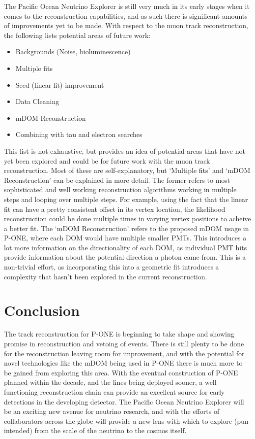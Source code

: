 The Pacific Ocean Neutrino Explorer is still very much in its early stages when it comes to the reconstruction capabilities, and as such there is significant amounts of improvements yet to be made. With respect to the muon track reconstruction, the following lists potential areas of future work:
\begin{multicols}{2}
  \begin{itemize}
  \item Backgrounds (Noise, bioluminescence)
  \item Multiple fits
  \item Seed (linear fit) improvement
  \item Data Cleaning
  \item mDOM Reconstruction
  \item Combining with tau and electron searches
  \end{itemize}
\end{multicols}
This list is not exhaustive, but provides an idea of potential areas that have not yet been explored and could be for future work with the muon track reconstruction. Most of these are self-explanatory, but `Multiple fits' and `mDOM Reconstruction' can be explained in more detail. The former refers to most sophisticated and well working reconstruction algorithms working in multiple steps and looping over multiple steps. For example, using the fact that the linear fit can have a pretty consistent offset in its vertex location, the likelihood reconstruction could be done multiple times in varying vertex positions to acheive a better fit. The `mDOM Reconstruction' refers to the proposed mDOM usage in P-ONE, where each DOM would have multiple smaller PMTs. This introduces a lot more information on the directionality of each DOM, as individual PMT hits provide information about the potential direction a photon came from. This is a non-trivial effort, as incorporating this into a geometric fit introduces a complexity that hasn't been explored in the current reconstruction.

\section{Conclusion}

The track reconstruction for P-ONE is beginning to take shape and showing promise in reconstruction and vetoing of events. There is still plenty to be done for the reconstruction leaving room for improvement, and with the potential for novel technologies like the mDOM being used in P-ONE there is much more to be gained from exploring this area. With the eventual construction of P-ONE planned within the decade, and the lines being deployed sooner, a well functioning reconstruction chain can provide an excellent source for early detections in the developing detector. The Pacific Ocean Neutrino Explorer will be an exciting new avenue for neutrino research, and with the efforts of collaborators across the globe will provide a new lens with which to explore (pun intended) from the scale of the neutrino to the cosmos itself. 
